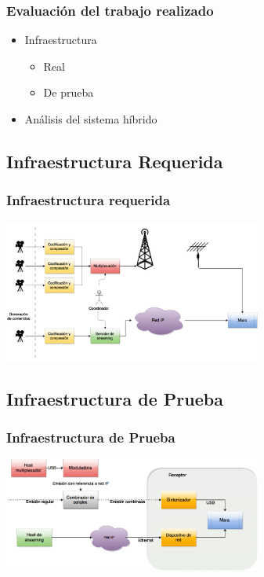 \documentclass[a4paper,11pt]{beamer}
\begin{document}
	\begin{frame}
		\frametitle{Evaluación del trabajo realizado}
		\begin{itemize}
			\item Infraestructura
				\begin{itemize}
					\item Real
					\item De prueba
				\end{itemize}
			\item Análisis del sistema híbrido
		\end{itemize}
	\end{frame}

	\subsection{Infraestructura Requerida}
		\begin{frame}
			\frametitle{Infraestructura requerida}
			\begin{center}
				\includegraphics[width=8.5cm]{infraestructura_extendida.png}
			\end{center}
		\end{frame}

	\subsection{Infraestructura de Prueba}
		\begin{frame}
			\frametitle{Infraestructura de Prueba}
			\begin{center}
				\includegraphics[width=8.5cm]{infraestructura_prueba.png}
			\end{center}
		\end{frame}
\end{document}
